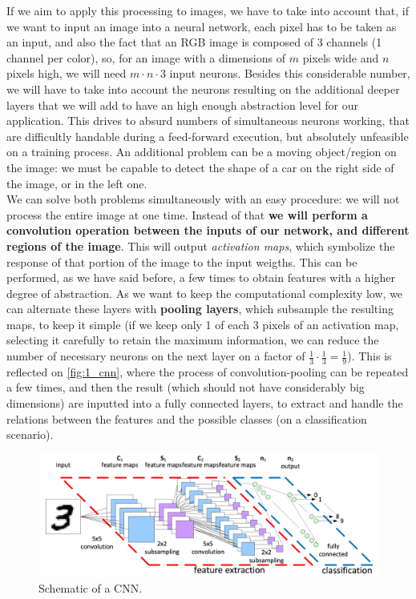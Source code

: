 If we aim to apply this processing to images, we have to take into account that, if we want to input an image into a neural network, each pixel has to be taken as an input, and also the fact that an RGB image is composed of 3 channels (1 channel per color), so, for an image with a dimensions of $m$ pixels wide and $n$ pixels high, we will need $m\cdot n \cdot 3$ input neurons. Besides this considerable number, we will have to take into account the neurons resulting on the additional deeper layers that we will add to have an high enough abstraction level for our application. This drives to absurd numbers of simultaneous neurons working, that are difficultly handable during a feed-forward execution, but absolutely unfeasible on a training process. An additional problem can be a moving object/region on the image: we must be capable to detect the shape of a car on the right side of the image, or in the left one.\\

We can solve both problems simultaneously with an easy procedure: we will not process the entire image at one time. Instead of that \textbf{we will perform a convolution operation between the inputs of our network, and different regions of the image}. This will output \emph{activation maps}, which symbolize the response of that portion of the image to the input weigths. This can be performed, as we have said before, a few times to obtain features with a higher degree of abstraction. As we want to keep the computational complexity low, we can alternate these layers with \textbf{pooling layers}, which subsample the resulting maps, to keep it simple (if we keep only 1 of each 3 pixels of an activation map, selecting it carefully to retain the maximum information, we can reduce the number of necessary neurons on the next layer on a factor of $\frac{1}{3} \cdot \frac{1}{3} = \frac{1}{9}$). This is reflected on \autoref{fig:1_cnn}, where the process of convolution-pooling can be repeated a few times, and then the result (which should not have considerably big dimensions) are inputted into a fully connected layers, to extract and handle the relations between the features and the possible classes (on a classification scenario).

\begin{figure}[h]
	\centering
	\includegraphics[width=0.9\linewidth]{images/cnn}
	\caption{Schematic of a CNN.}
	\label{fig:1_cnn}
\end{figure}

